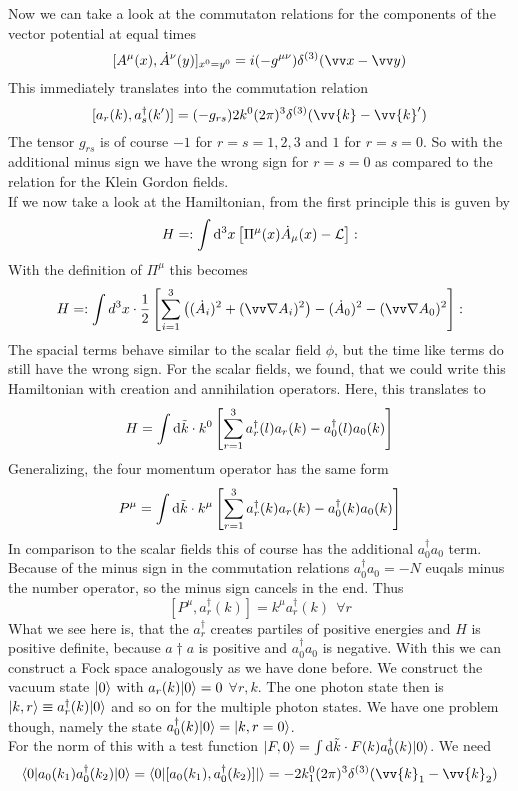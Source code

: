 Now we can take a look at the commutaton relations for the components of the vector potential at equal times
\[ [ A^\mu(x), \dot A ^\nu(y)]_{x^0 = y^0} = i (-g^{\mu\nu}) \delta^{(3)}( \vx - \vy)\]
This immediately translates into the commutation relation
\[ [ a_r(k), a_s^\dagger(k')] = (-g_{rs}) 2 k^0 ( 2\pi)^3 \delta^{(3)}(\vv{k} - \vv{k}')\]
The tensor $g_{rs}$ is of course $-1$ for $r = s = 1,2,3$  and $1$ for $r = s = 0$. So with the additional minus sign we have the wrong sign for $r = s = 0$ as compared to the relation for the Klein Gordon fields.\\
If we now take a look at the Hamiltonian, from the first principle this is guven by
\[ H = : \int {\rm d} ^3 x \left[ \Pi^\mu (x) \dot A_\mu(x) - \mathcal{L} \right]:\]
With the definition of $\Pi^\mu$ this becomes
\[ H = :\int d^3 x \cc \frac{1}{2} \left[ \sum_{i = 1}^3 \left( (\dot A_i)^2 + (\vn A_i)^2 \right) - (\dot A_0)^2 - (\vn A_0)^2 \right] :\]
The spacial terms behave similar to the scalar field $\phi$, but the time like terms do still have the wrong sign. For the scalar fields, we found, that we could write this Hamiltonian with creation and annihilation operators. Here, this translates to
\[ H = \int {\rm d} \tilde k \cdot k^0 \left[ \sum_{r = 1}^3 a_r^\dagger(l) a_r(k) - a_0^\dagger(l) a_0(k) \right]\]
Generalizing, the four momentum operator has the same form
\[ P^\mu = \int {\rm d} \tilde k \cdot k^\mu \left[ \sum_{r = 1}^3 a_r^\dagger(k) a_r(k) - a_0^\dagger(k) a_0(k)\right]\]
In comparison to the scalar fields this of course has the additional $a_0^\dagger a_0$ term.\\
Because of the minus sign in the commutation relations $a_0^\dagger a_0 = -N$ euqals minus the number operator, so the minus sign cancels in the end. Thus 
\[ [ P^\mu , a_r^\dagger(k)] = k^\mu a_r^\dagger(k)~~\forall r\]
What we see here is, that the $a_r^\dagger$ creates partiles of positive energies and $H$ is positive definite, because $a\dagger a$ is positive and $a_0^\dagger a_0$ is negative. With this we can construct a Fock space analogously as we have done before.
We construct the vacuum state $| 0 \rangle$ with $a_r (k) | 0 \rangle = 0$ $\forall r, k$. The one photon state then is $|k, r\rangle \equiv a_r^\dagger(k) | 0 \rangle$ and so on for the multiple photon states.
We have one problem though, namely the state $a_0^\dagger(k) | 0 \rangle = | k, r = 0\rangle$.\\
For the norm of this with a test function $| F, 0 \rangle = \int {\rm d} \tilde k \cdot F(k) a_0^\dagger(k) | 0 \rangle$. We need
\[ \lk 0 | a_0(k_1) a_0^\dagger(k_2) | 0 \rk = \lk 0 | [ a_0 (k_1) , a_0 ^\dagger(k_2) ] | \rk = - 2 k_1^0 (2\pi)^3 \delta^{(3)}(\vv{k}_1 - \vv{k}_2)\]
